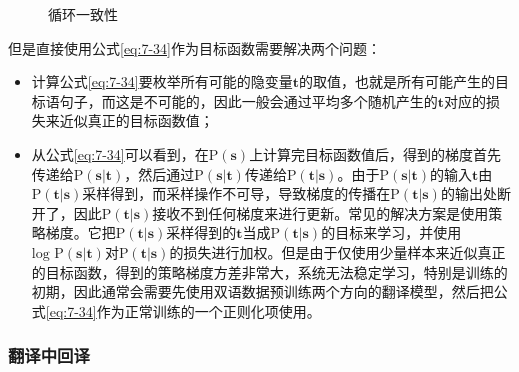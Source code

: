 \begin{figure}[htp]
\centering

\caption{循环一致性}
\label{fig:7-43}
\end{figure}

\parinterval 但是直接使用公式\ref{eq:7-34}作为目标函数需要解决两个问题：

\begin{itemize}
\vspace{0.5em}
\item 计算公式\ref{eq:7-34}要枚举所有可能的隐变量$\mathbf t$的取值，也就是所有可能产生的目标语句子，而这是不可能的，因此一般会通过平均多个随机产生的$\mathbf t$对应的损失来近似真正的目标函数值；
\vspace{0.5em}
\item 从公式\ref{eq:7-34}可以看到，在$\textrm{P}(\mathbf s)$上计算完目标函数值后，得到的梯度首先传递给$\textrm{P}(\mathbf s|\mathbf t)$，然后通过$\textrm{P}(\mathbf s|\mathbf t)$传递给$\textrm{P}(\mathbf t|\mathbf s)$。由于$\textrm{P}(\mathbf s|\mathbf t)$的输入$\mathbf t$由$\textrm{P}(\mathbf t|\mathbf s)$采样得到，而采样操作不可导，导致梯度的传播在$\textrm{P}(\mathbf t|\mathbf s)$的输出处断开了，因此$\textrm{P}(\mathbf t|\mathbf s)$接收不到任何梯度来进行更新。常见的解决方案是使用策略梯度\cite{DBLP:conf/nips/SuttonMSM99}。它把$\textrm{P}(\mathbf t|\mathbf s)$采样得到的$\mathbf t$当成$\textrm{P}(\mathbf t|\mathbf s)$的目标来学习，并使用$\textrm{log P}(\mathbf s|\mathbf t)$对$\textrm{P}(\mathbf t|\mathbf s)$的损失进行加权。但是由于仅使用少量样本来近似真正的目标函数，得到的策略梯度方差非常大，系统无法稳定学习，特别是训练的初期，因此通常会需要先使用双语数据预训练两个方向的翻译模型，然后把公式\ref{eq:7-34}作为正常训练的一个正则化项使用。
\vspace{0.5em}
\end{itemize}


\subsubsection{翻译中回译}

